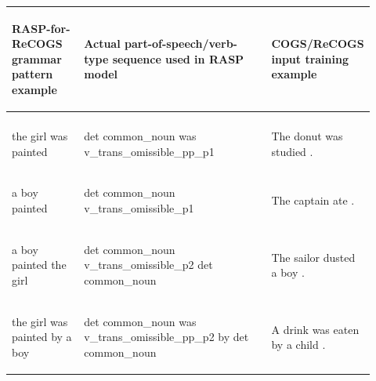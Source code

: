\documentclass[11pt]{article}
\begin{document}
\clearpage
\onecolumn
\begin{table}
\centering
\begin{tabular}{p{0.2\linewidth} p{0.52\linewidth} p{0.2\linewidth}}
\hline
\begin{small}\textbf{RASP-for-ReCOGS grammar pattern example}\end{small} & \begin{small}\textbf{Actual part-of-speech/verb-type sequence used in RASP model}\end{small} & \begin{small}\textbf{COGS/ReCOGS input training example}\end{small}\\
\hline
\begin{small}\end{small} & \begin{small}\end{small} & \begin{small}\end{small} \\
\begin{small}the girl was painted\end{small} & \begin{small}det common\_noun was v\_trans\_omissible\_pp\_p1 \end{small} & \begin{small}The donut was studied .\end{small} \\
\begin{small}a boy painted\end{small} & \begin{small}det common\_noun v\_trans\_omissible\_p1 \end{small} & \begin{small}The captain ate .\end{small} \\
\begin{small}a boy painted the girl\end{small} & \begin{small}det common\_noun v\_trans\_omissible\_p2 det common\_noun \end{small} & \begin{small}The sailor dusted a boy .\end{small} \\
\begin{small}the girl was painted by a boy\end{small} & \begin{small}det common\_noun was v\_trans\_omissible\_pp\_p2 by det common\_noun \end{small} & \begin{small}A drink was eaten by a child .\end{small} \\

\end{tabular}
\end{table}
\end{document}

